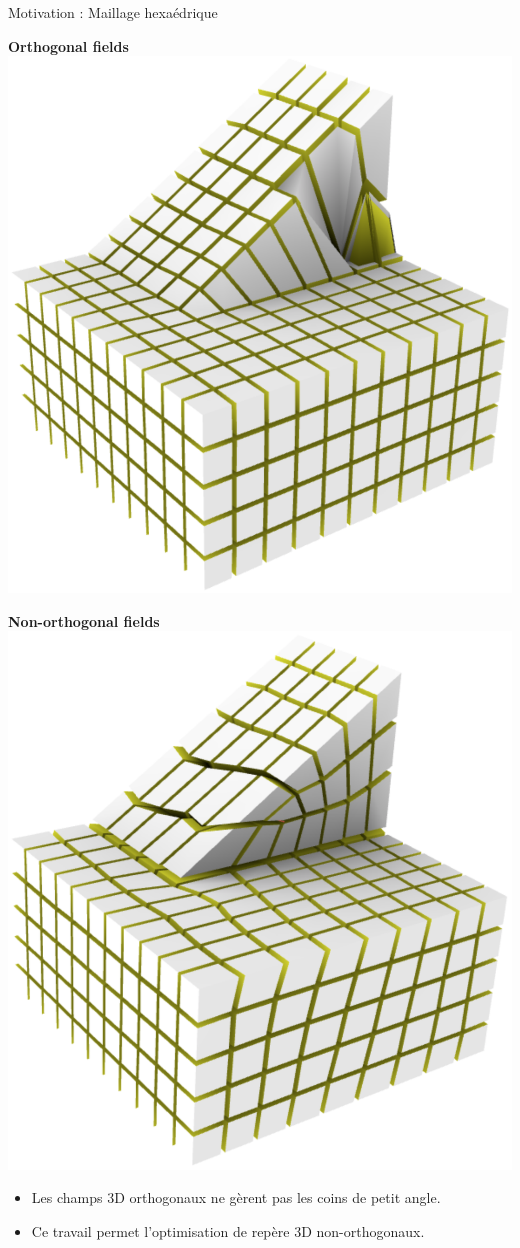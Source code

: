 
\begin{frame}{Motivation : Maillage hexaédrique}
    \centering
    
    \begin{minipage}[c]{0.48\textwidth}
    \centering 
    \textbf{Orthogonal fields}\\
    \vspace{0.3cm}
    \includegraphics[width=.7\linewidth]{img_spm_ff/slope_ortho_front.png}
    \end{minipage}%
    \hfill\vline\hfill
    \begin{minipage}[c]{0.48\textwidth}
    \centering 
    \textbf{Non-orthogonal fields}\\
    \vspace{0.3cm}
    \includegraphics[width=.7\linewidth]{img_spm_ff/slope_northo_front.png}
    \end{minipage}
    
    \vspace*{0.3cm}
    \begin{itemize}
        \item Les champs 3D orthogonaux ne gèrent pas les coins de petit angle.
        \item Ce travail permet l'optimisation de repère 3D non-orthogonaux.
   \end{itemize}
    
\end{frame}


